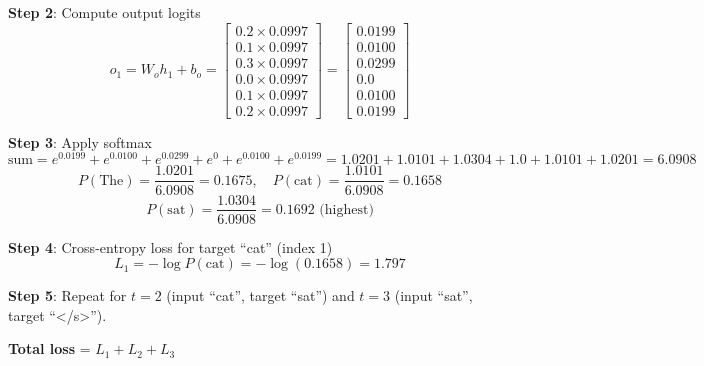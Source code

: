\documentclass[11pt,a4paper]{article}
\begin{document}
\begin{tcolorbox}[colback=green!5!white,colframe=green!75!black,title=\textbf{Worked Example 21: RNN Forward Pass and Cross-Entropy Loss}]
\textbf{Step 2}: Compute output logits
\[
o_1 = W_o h_1 + b_o = \begin{bmatrix} 0.2 \times 0.0997 \\ 0.1 \times 0.0997 \\ 0.3 \times 0.0997 \\ 0.0 \times 0.0997 \\ 0.1 \times 0.0997 \\ 0.2 \times 0.0997 \end{bmatrix} = \begin{bmatrix} 0.0199 \\ 0.0100 \\ 0.0299 \\ 0.0 \\ 0.0100 \\ 0.0199 \end{bmatrix}
\]

\textbf{Step 3}: Apply softmax
\[
\text{sum} = e^{0.0199} + e^{0.0100} + e^{0.0299} + e^{0} + e^{0.0100} + e^{0.0199} = 1.0201 + 1.0101 + 1.0304 + 1.0 + 1.0101 + 1.0201 = 6.0908
\]
\[
P(\text{The}) = \frac{1.0201}{6.0908} = 0.1675, \quad P(\text{cat}) = \frac{1.0101}{6.0908} = 0.1658
\]
\[
P(\text{sat}) = \frac{1.0304}{6.0908} = 0.1692 \text{ (highest)}
\]

\textbf{Step 4}: Cross-entropy loss for target ``cat'' (index 1)
\[
L_1 = -\log P(\text{cat}) = -\log(0.1658) = 1.797
\]

\textbf{Step 5}: Repeat for $t=2$ (input ``cat'', target ``sat'') and $t=3$ (input ``sat'', target ``</s>'').

\textbf{Total loss} = $L_1 + L_2 + L_3$
\end{tcolorbox}
\end{document}
